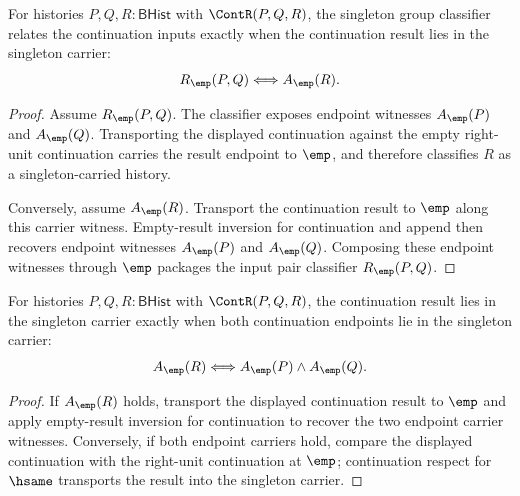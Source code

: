 \begin{theorem}
\label{thm:group-singleton-continuation-result-carrier-exactness}
For histories $P,Q,R:\mathsf{BHist}$ with $\ContR(P,Q,R)$, the singleton group
classifier relates the continuation inputs exactly when the continuation result
lies in the singleton carrier:
$$
R_{\emp}(P,Q)\Longleftrightarrow A_{\emp}(R).
$$
\end{theorem}
\begin{proof}
Assume $R_{\emp}(P,Q)$. The classifier exposes endpoint witnesses
$A_{\emp}(P)$ and $A_{\emp}(Q)$. Transporting the displayed continuation
against the empty right-unit continuation carries the result endpoint to
$\emp$, and therefore classifies $R$ as a singleton-carried history.

Conversely, assume $A_{\emp}(R)$. Transport the continuation result to $\emp$
along this carrier witness. Empty-result inversion for continuation and append
then recovers endpoint witnesses $A_{\emp}(P)$ and $A_{\emp}(Q)$. Composing
these endpoint witnesses through $\emp$ packages the input pair classifier
$R_{\emp}(P,Q)$.
\end{proof}

\begin{theorem}
\label{thm:group-singleton-carrier-continuation-endpoint-split}
For histories $P,Q,R:\mathsf{BHist}$ with $\ContR(P,Q,R)$, the continuation
result lies in the singleton carrier exactly when both continuation endpoints
lie in the singleton carrier:
$$
A_{\emp}(R)\Longleftrightarrow A_{\emp}(P)\land A_{\emp}(Q).
$$
\end{theorem}
\begin{proof}
If $A_{\emp}(R)$ holds, transport the displayed continuation result to $\emp$
and apply empty-result inversion for continuation to recover the two endpoint
carrier witnesses. Conversely, if both endpoint carriers hold, compare the
displayed continuation with the right-unit continuation at $\emp$; continuation
respect for $\hsame$ transports the result into the singleton carrier.
\end{proof}

